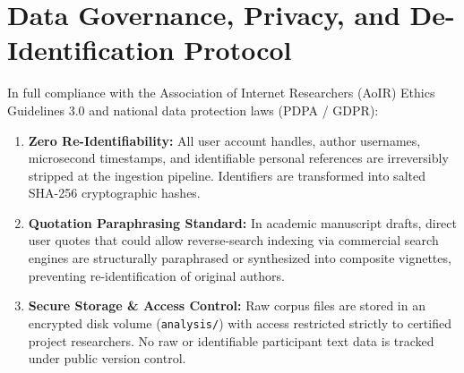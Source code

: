 \documentclass[11pt,a4paper]{article}
\begin{document}
\section{Data Governance, Privacy, and De-Identification Protocol}
In full compliance with the Association of Internet Researchers (AoIR) Ethics Guidelines 3.0 and national data protection laws (PDPA / GDPR):
\begin{enumerate}
    \item \textbf{Zero Re-Identifiability:} All user account handles, author usernames, microsecond timestamps, and identifiable personal references are irreversibly stripped at the ingestion pipeline. Identifiers are transformed into salted SHA-256 cryptographic hashes.
    \item \textbf{Quotation Paraphrasing Standard:} In academic manuscript drafts, direct user quotes that could allow reverse-search indexing via commercial search engines are structurally paraphrased or synthesized into composite vignettes, preventing re-identification of original authors.
    \item \textbf{Secure Storage \& Access Control:} Raw corpus files are stored in an encrypted disk volume (\texttt{analysis/}) with access restricted strictly to certified project researchers. No raw or identifiable participant text data is tracked under public version control.
\end{enumerate}
\end{document}
